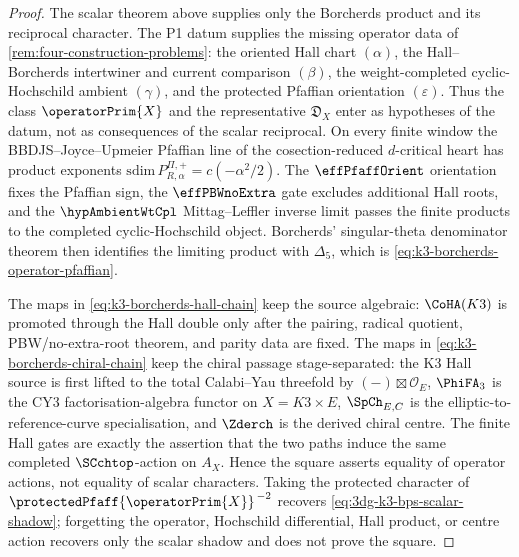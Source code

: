 \begin{proof}
The scalar theorem above supplies only the Borcherds product and its
reciprocal character. The P1 datum supplies the missing operator data of
\cref{rem:four-construction-problems}: the oriented Hall chart
\((\alpha)\), the Hall--Borcherds intertwiner and current comparison
\((\beta)\), the weight-completed cyclic-Hochschild ambient
\((\gamma)\), and the protected Pfaffian orientation
\((\varepsilon)\).  Thus the class \(\operatorPrim{X}\) and the
representative \(\mathfrak D_X\) enter as hypotheses of the datum, not
as consequences of the scalar reciprocal.  On every finite window the
BBDJS--Joyce--Upmeier Pfaffian line of the cosection-reduced
\(d\)-critical heart has product exponents
\(\mathrm{sdim}\,P^{\Pi,+}_{R,\alpha}=c(-\alpha^{2}/2)\).  The
\(\effPfaffOrient\) orientation fixes the Pfaffian sign, the
\(\effPBWnoExtra\) gate excludes additional Hall roots, and the
\(\hypAmbientWtCpl\) Mittag--Leffler inverse limit passes the finite
products to the completed cyclic-Hochschild object.  Borcherds'
singular-theta denominator theorem then identifies the limiting product
with \(\Delta_5\), which is
\eqref{eq:k3-borcherds-operator-pfaffian}.

The maps in \eqref{eq:k3-borcherds-hall-chain} keep the source
algebraic: \(\CoHA(K3)\) is promoted through the Hall double only
after the pairing, radical quotient, PBW/no-extra-root theorem, and
parity data are fixed. The maps in
\eqref{eq:k3-borcherds-chiral-chain} keep the chiral passage
stage-separated: the K3 Hall source is first lifted to the total
Calabi--Yau threefold by \((-) \boxtimes \mathcal O_E\), \(\PhiFA_3\)
is the CY3 factorisation-algebra functor on \(X=K3\times E\),
\(\SpCh_{E,C}\) is the elliptic-to-reference-curve specialisation, and
\(\Zderch\) is the derived chiral centre. The finite Hall gates are
exactly the assertion that the two paths induce the same completed
\(\SCchtop\)-action on \(A_X\).  Hence
the square asserts equality of operator actions, not equality of scalar
characters. Taking the protected character of
\(\protectedPfaff{\operatorPrim{X}}^{\, -2}\) recovers
\eqref{eq:3dg-k3-bps-scalar-shadow}; forgetting the operator,
Hochschild differential, Hall product, or centre action recovers only
the scalar shadow and does not prove the square.
\end{proof}

